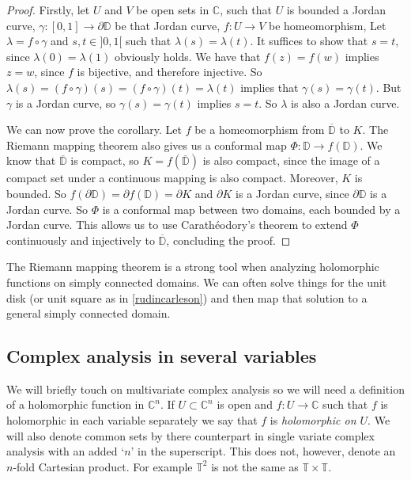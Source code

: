 \documentclass[a4paper,12pt,twoside,BCOR=10mm]{scrbook}
\theoremstyle{definition}
\theoremstyle{definition}
\theoremstyle{definition}
\begin{document}
\begin{proof}

Firstly, let
	$U$ and $V$ be open sets in $\mathbb{C}$,
	such that $U$ is bounded a Jordan curve,
	$\gamma: [0, 1] \rightarrow \partial \mathbb{D}$ be that Jordan curve,
	$f: U \rightarrow V$ be homeomorphism,
Let $\lambda = f \circ \gamma$ and $s, t \in ]0, 1[$ such that $\lambda(s) = \lambda(t)$.
It suffices to show that $s = t$, since $\lambda(0) = \lambda(1)$ obviously holds.
We have that $f(z) = f(w)$ implies $z = w$, since $f$ is bijective, and therefore injective.
So $\lambda(s) = (f \circ \gamma)(s) = (f \circ \gamma)(t) = \lambda(t)$ implies that $\gamma(s) = \gamma(t)$.
But $\gamma$ is a Jordan curve, so $\gamma(s) = \gamma(t)$ implies $s = t$.
So $\lambda$ is also a Jordan curve. 

We can now prove the corollary.
Let $f$ be a homeomorphism from $\overline{\mathbb{D}}$ to $K$.
The Riemann mapping theorem also gives us a conformal map $\Phi: \mathbb{D} \rightarrow f(\mathbb{D})$.
We know that $\overline{\mathbb{D}}$ is compact, so $K = f(\overline{\mathbb{D}})$ is also compact, since the image of a compact set under a continuous mapping is also compact.
Moreover, $K$ is bounded.
So $f(\partial \mathbb{D}) = \partial f(\mathbb{D}) = \partial K$ and $\partial K$ is a Jordan curve, since $\partial \mathbb{D}$ is a Jordan curve.
So $\Phi$ is a conformal map between two domains, each bounded by a Jordan curve.
This allows us to use Carathéodory's theorem to extend $\Phi$ continuously and injectively to $\overline{\mathbb{D}}$, concluding the proof.
\end{proof}
The Riemann mapping theorem is a strong tool when analyzing holomorphic functions on simply connected domains.
We can often solve things for the unit disk (or unit square as in \ref{rudincarleson}) and then map that solution to a general simply connected domain.

\subsection{Complex analysis in several variables}
We will briefly touch on multivariate complex analysis so we will need a definition of a holomorphic function in $\mathbb{C}^n$.
If $U \subset \mathbb{C}^n$ is open and $f: U \rightarrow \mathbb{C}$ such that $f$ is holomorphic in each variable separately we say that $f$ is \emph{holomorphic on $U$}.
We will also denote common sets by there counterpart in single variate complex analysis with an added `$n$' in the superscript.
This does not, however, denote an $n$-fold Cartesian product.
For example $\mathbb{T}^2$ is not the same as $\mathbb{T} \times \mathbb{T}$.
\end{document}
